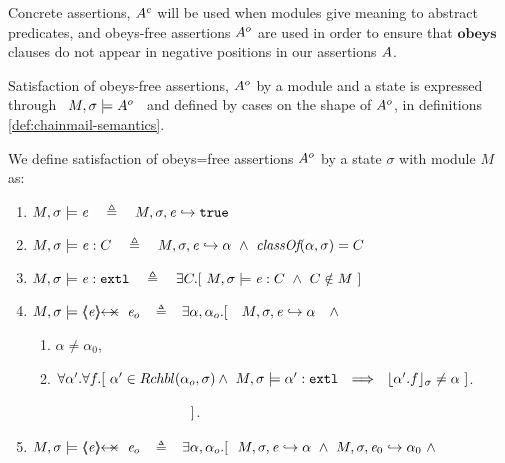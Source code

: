 Concrete assertions, $A^{c}$ will be used when modules give meaning to abstract predicates, and obeys-free assertions $A^{o}$ are used in order to ensure that $\textbf{obeys}$ clauses do not appear in negative positions in our assertions $A$.
 
 Satisfaction  of  obeys-free assertions, $A^{o}$ by a module and a state is expressed  through \ $M , \sigma \models {A^{o}}$ \  and defined by cases on the shape of $A^{o}$, in definitions \ref{def:chainmail-semantics}.


\begin{definition} 
\label{def:chainmail-semantics}
\label{def:chainmail-protection-from}
\label{sect:semantics:assert:prtFrom}
 \label{def:chainmail-protection}
 We define satisfaction of obeys=free assertions $A^{o}$ by a %
state $\sigma$ with 
 module $M$ as:
\begin{enumerate}
\item
\label{cExpr}
$\satisfiesA{M}{\sigma}{{\re}}\ \ \ \triangleq \ \ \   \eval{M}{\sigma}{{\re}}{\true}$
\item
\label{cClass}
$M , \sigma \models {{\mathit{e}}} : C\ \ \ \triangleq \ \ \   M, \sigma, {\mathit{e}} \hookrightarrow \alpha\   \wedge \ \textit{classOf}(\alpha, \sigma)= C$
\item
\label{cExternal}
$\satisfiesA{M}{\sigma}{\external{{\re}}} \ \ \ \triangleq \ \ \  \exists C.[\ \satisfiesA{M}{\sigma}{{{\re}} : C} \ \wedge \ C \notin M \ ]$
 \item
 \label{cProtected}
$\satisfiesA{M}{\sigma}{\protectedFrom{{\re}} {{\re_{o}}}}$ $\ \  \triangleq\ \ $
$\exists \alpha, \alpha_{o}. [\  \ \  \eval{M}{\sigma}{{\re}}{\alpha}\ \ \ \wedge\ $

  \begin{enumerate}
 \item
$\alpha\neq \alpha_0$,
 \item
$\forall \alpha'.\forall f.[\ \alpha' \in {\ensuremath{Rchbl(\alpha_o,\sigma)}} \wedge\   M , \sigma \models \alpha':\mbox{\normalfont{\texttt{extl}}} 
\ \ \Longrightarrow \ \  
  \lfloor \alpha'.f \rfloor_{\sigma} \neq \alpha     \ ] $.
\end{enumerate}

$  \strut \hspace{4cm} ] $.
 \item
 \label{sect:semantics:assert:prt}
$\satisfiesA{M}{\sigma}{\protectedFrom{{\re}} {{\re_{o}}}}$ $\ \  \triangleq\ \ $
$\exists \alpha, \alpha_{o}. [\  \  \eval{M}{\sigma}{{\re}}{\alpha}\ \wedge\ \eval{M}{\sigma}{{\re_0}}{\alpha_0} \  \wedge$  %


\end{enumerate}
\end{definition}
